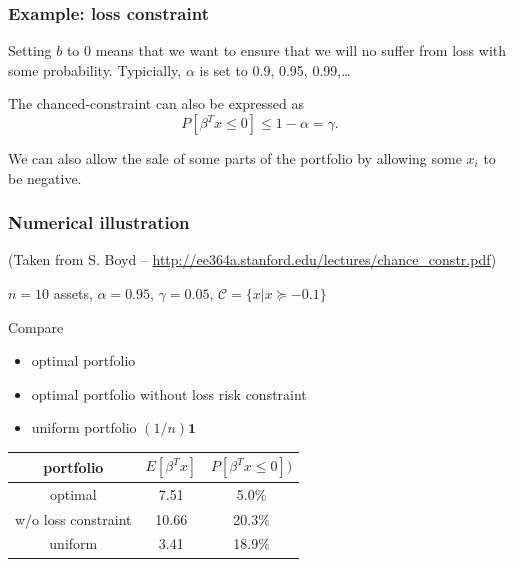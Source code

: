\documentclass{beamer}
\begin{document}
\begin{frame}
\frametitle{Example: loss constraint}

Setting $b$ to 0 means that we want to ensure that we will no suffer from loss with some probability. Typicially, $\alpha$ is set to 0.9, 0.95, 0.99,\ldots

\mbox{}

The chanced-constraint can also be expressed as
\[
P\left[ \beta^T x \leq 0 \right] \leq 1-\alpha = \gamma.
\]

\mbox{}

We can also allow the sale of some parts of the portfolio by allowing some $x_i$ to be negative.
\end{frame}

\begin{frame}
\frametitle{Numerical illustration}

(Taken from S. Boyd -- \url{http://ee364a.stanford.edu/lectures/chance_constr.pdf})

$n = 10$ assets, $\alpha = 0.95$, $\gamma = 0.05$, $\mathcal{C} = \{x | x \succeq -0.1\}$

\mbox{}

Compare
\begin{itemize}
\item
optimal portfolio
\item
optimal portfolio without loss risk constraint
\item
uniform portfolio $(1/n)\mathbf{1}$
\end{itemize}

\mbox{}

\begin{center}
\begin{tabular}{c|c|c}
portfolio & $E[\beta^T x]$ & $P[\beta^T x \leq 0])$ \\
\hline
optimal & 7.51 & 5.0\% \\
w/o loss constraint & 10.66 & 20.3\% \\
uniform & 3.41 & 18.9\%
\end{tabular}
\end{center}

\end{frame}

\end{document}
